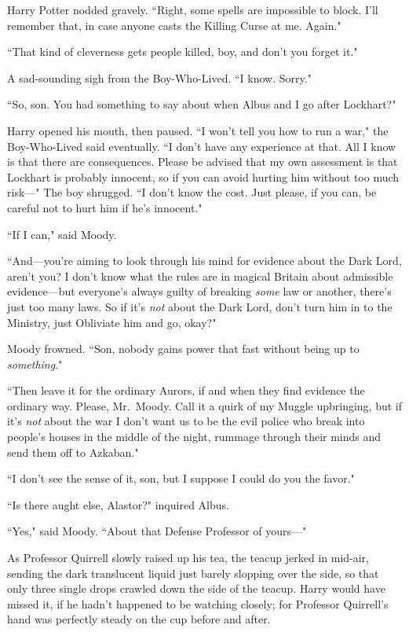 Harry Potter nodded gravely. ``Right, some spells are impossible to block. I'll remember that, in case anyone casts the Killing Curse at me. Again."

``That kind of cleverness gets people killed, boy, and don't you forget it."

A sad-sounding sigh from the Boy-Who-Lived. ``I know. Sorry."

``So, son. You had something to say about when Albus and I go after Lockhart?"

Harry opened his mouth, then paused. ``I won't tell you how to run a war," the Boy-Who-Lived said eventually. ``I don't have any experience at that. All I know is that there are consequences. Please be advised that my own assessment is that Lockhart is probably innocent, so if you can avoid hurting him without too much risk—" The boy shrugged. ``I don't know the cost. Just please, if you can, be careful not to hurt him if he's innocent."

``If I can," said Moody.

``And—you're aiming to look through his mind for evidence about the Dark Lord, aren't you? I don't know what the rules are in magical Britain about admissible evidence—but everyone's always guilty of breaking \emph{some} law or another, there's just too many laws. So if it's \emph{not} about the Dark Lord, don't turn him in to the Ministry, just Obliviate him and go, okay?"

Moody frowned. ``Son, nobody gains power that fast without being up to \emph{something}."

``Then leave it for the ordinary Aurors, if and when they find evidence the ordinary way. Please, Mr.~Moody. Call it a quirk of my Muggle upbringing, but if it's \emph{not} about the war I don't want us to be the evil police who break into people's houses in the middle of the night, rummage through their minds and send them off to Azkaban."

``I don't see the sense of it, son, but I suppose I could do you the favor."

``Is there aught else, Alastor?" inquired Albus.

``Yes," said Moody. ``About that Defense Professor of yours—"



As Professor Quirrell slowly raised up his tea, the teacup jerked in mid-air, sending the dark translucent liquid just barely slopping over the side, so that only three single drops crawled down the side of the teacup. Harry would have missed it, if he hadn't happened to be watching closely; for Professor Quirrell's hand was perfectly steady on the cup before and after.

